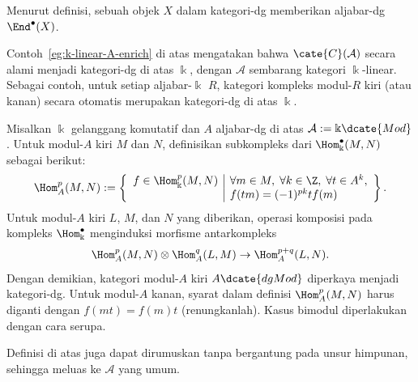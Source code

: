 Menurut definisi, sebuah objek $X$ dalam kategori-dg memberikan aljabar-dg
$\End^\bullet(X)$.

\begin{example}\label{eg:CA-dg-cat}
	Contoh~\ref{eg:k-linear-A-enrich} di atas mengatakan bahwa
	$\cate{C}(\mathcal{A})$ secara alami menjadi kategori-dg di atas $\Bbbk$,
	dengan $\mathcal{A}$ sembarang kategori $\Bbbk$-linear. Sebagai contoh,
	untuk setiap aljabar-$\Bbbk$ $R$, kategori kompleks modul-$R$ kiri (atau
	kanan) secara otomatis merupakan kategori-dg di atas $\Bbbk$.
\end{example}

\begin{example}\label{eg:dg-Hom-cplx}
	Misalkan $\Bbbk$ gelanggang komutatif dan $A$ aljabar-dg di atas
	$\mathcal{A}:=\Bbbk\dcate{Mod}$. Untuk modul-$A$ kiri $M$ dan $N$,
	definisikan subkompleks dari $\Hom^\bullet_{\Bbbk}(M,N)$ sebagai berikut:
	\[ \Hom^p_A(M, N) := \left\{\begin{array}{r|l}
		f \in \Hom^p_{\Bbbk}(M, N) & \forall m \in M, \; \forall k \in \Z, \; \forall t \in A^k, \\
		& f(tm) = (-1)^{pk} tf(m)
	\end{array}\right\}. \]
	Untuk modul-$A$ kiri $L$, $M$, dan $N$ yang diberikan, operasi komposisi
	pada kompleks $\Hom^\bullet_{\Bbbk}$ menginduksi morfisme antarkompleks
	\[ \Hom^p_A(M, N) \otimes \Hom^q_A(L, M) \to \Hom^{p+q}_A(L, N). \]
	Dengan demikian, kategori modul-$A$ kiri $A\dcate{dgMod}$ diperkaya menjadi
	kategori-dg. Untuk modul-$A$ kanan, syarat dalam definisi
	$\Hom^p_A(M,N)$ harus diganti dengan $f(mt)=f(m)t$ (renungkanlah).
	Kasus bimodul diperlakukan dengan cara serupa.

	Definisi di atas juga dapat dirumuskan tanpa bergantung pada unsur
	himpunan, sehingga meluas ke $\mathcal{A}$ yang umum.
\end{example}

